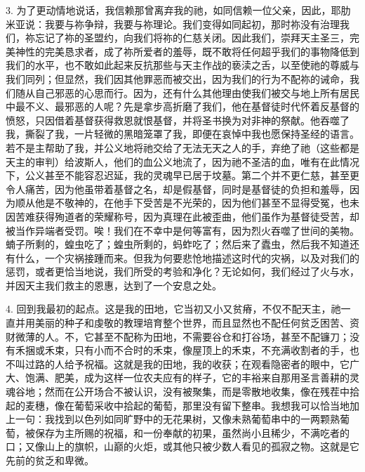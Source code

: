 3. 为了更动情地说话，我信赖那曾离弃我的祂，如同信赖一位父亲，因此，耶肋米亚说：我要与祢争辩，我要与祢理论。我们变得如同起初，那时祢没有治理我们，祢忘记了祢的圣盟约，向我们将祢的仁慈关闭。因此我们，崇拜天主圣三，完美神性的完美恳求者，成了祢所爱者的羞辱，既不敢将任何超乎我们的事物降低到我们的水平，也不敢如此起来反抗那些与天主作战的亵渎之舌，以至使祂的尊威与我们同列；但显然，我们因其他罪恶而被交出，因为我们的行为不配祢的诫命，我们随从自己邪恶的心思而行。因为，还有什么其他理由使我们被交与地上所有居民中最不义、最邪恶的人呢？先是拿步高折磨了我们，他在基督徒时代怀着反基督的愤怒，只因借着基督获得救恩就恨基督，并将圣书换为对非神的祭献。他吞噬了我，撕裂了我，一片轻微的黑暗笼罩了我，即便在哀悼中我也愿保持圣经的语言。若不是主帮助了我，并公义地将祂交给了无法无天之人的手，弃绝了祂（这些都是天主的审判）给波斯人，他们的血公义地流了，因为祂不圣洁的血，唯有在此情况下，公义甚至不能容忍迟延，我的灵魂早已居于坟墓。第二个并不更仁慈，甚至更令人痛苦，因为他虽带着基督之名，却是假基督，同时是基督徒的负担和羞辱，因为顺从他是不敬神的，在他手下受苦是不光荣的，因为他们甚至不显得受冤，也未因苦难获得殉道者的荣耀称号，因为真理在此被歪曲，他们虽作为基督徒受苦，却被当作异端者受罚。唉！我们在不幸中是何等富有，因为烈火吞噬了世间的美物。蝻子所剩的，蝗虫吃了；蝗虫所剩的，蚂蚱吃了；然后来了蠹虫，然后我不知道还有什么，一个灾祸接踵而来。但我为何要悲怆地描述这时代的灾祸，以及对我们的惩罚，或者更恰当地说，我们所受的考验和净化？无论如何，我们经过了火与水，并因天主我们救主的恩惠，达到了一个安息之处。\par

4. 回到我最初的起点。这是我的田地，它当初又小又贫瘠，不仅不配天主，祂一直并用美丽的种子和虔敬的教理培育整个世界，而且显然也不配任何贫乏困苦、资财微薄的人。不，它甚至不配称为田地，不需要谷仓和打谷场，甚至不配镰刀；没有禾捆或禾束，只有小而不合时的禾束，像屋顶上的禾束，不充满收割者的手，也不叫过路的人给予祝福。这就是我的田地，我的收获；在观看隐密者的眼中，它广大、饱满、肥美，成为这样一位农夫应有的样子，它的丰裕来自那用圣言善耕的灵魂谷地；然而在公开场合不被认识，没有被聚集，而是零散地收集，像在残茬中拾起的麦穗，像在葡萄采收中拾起的葡萄，那里没有留下整串。我想我可以恰当地加上一句：我找到以色列如同旷野中的无花果树，又像未熟葡萄串中的一两颗熟葡萄，被保存为主所赐的祝福，和一份奉献的初果，虽然尚小且稀少，不满吃者的口；又像山上的旗帜，山巅的火炬，或其他只被少数人看见的孤寂之物。这就是它先前的贫乏和卑微。\par

